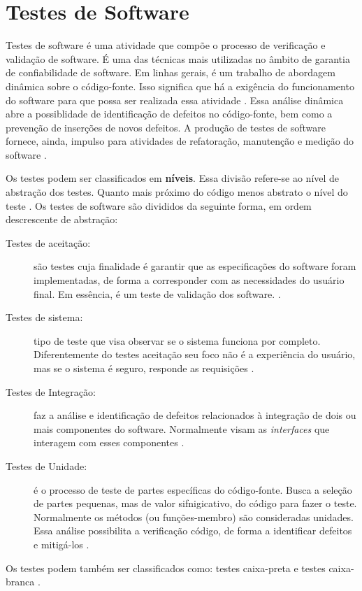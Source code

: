 \section{Testes de Software}
Testes de software é uma atividade que compõe o processo de verificação e validação de software. É uma das técnicas mais utilizadas no âmbito de garantia de confiabilidade de software. Em linhas gerais, é um trabalho de abordagem dinâmica sobre o código-fonte. Isso significa que há a exigência do funcionamento do software para que possa ser realizada essa atividade \cite{barbosaEtAl2009}. Essa análise dinâmica abre a possiblidade de identificação de defeitos no código-fonte, bem como a prevenção de inserções de novos defeitos. A produção de testes de software fornece, ainda, impulso para atividades de refatoração, manutenção e medição do software \cite{barbosaEtAl2009}.
\par
\indent Os testes podem ser classificados em \textbf{níveis}. Essa divisão refere-se ao nível de abstração dos testes. Quanto mais próximo do código menos abstrato o nível do teste \cite{sommerville2007}. Os testes de software são divididos da seguinte forma, em ordem descrescente de abstração:
\begin{description}
\item[Testes de aceitação:] são testes cuja finalidade é garantir que as especificações do software foram implementadas, de forma a corresponder com as necessidades do usuário final. Em essência, é um teste de validação dos software. \cite{sommerville2007}.
\item[Testes de sistema:] tipo de teste que visa observar se o sistema funciona por completo. Diferentemente do testes aceitação seu foco não é a experiência do usuário, mas se o sistema é seguro, responde as requisições \cite{sommerville2007}.
\item[Testes de Integração:] faz a análise e identificação de defeitos relacionados à integração de dois ou mais componentes do software. Normalmente visam as \textit{interfaces} que interagem com esses componentes \cite{sommerville2007}.
\item[Testes de Unidade:] é o processo de teste de partes específicas do código-fonte. Busca a seleção de partes pequenas, mas de valor sifnigicativo, do código para fazer o teste. Normalmente os métodos (ou funções-membro) são consideradas unidades. Essa análise possibilita a verificação código, de forma a identificar defeitos e mitigá-los \cite{sommerville2007}.
\end{description}
\par
\indent Os testes podem também ser classificados como: testes caixa-preta e testes caixa-branca \cite{barbosaEtAl2009}.

